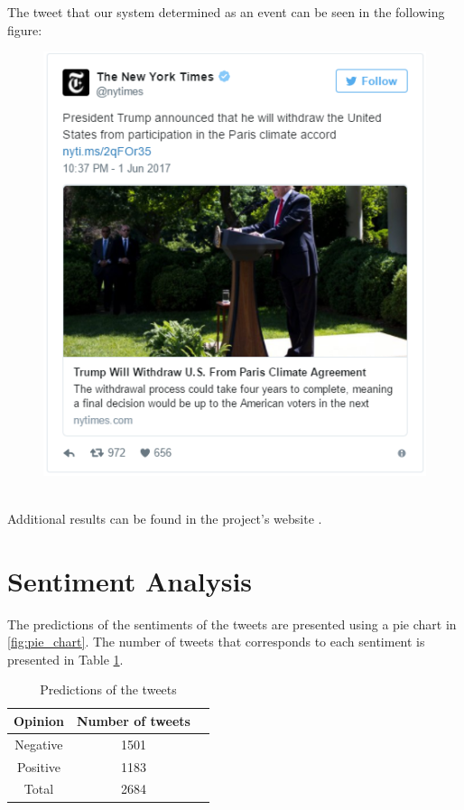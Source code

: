 \documentclass[12pt,svgnames]{report}
\begin{document}
\newpage
The tweet that our system determined as an event can be seen in the following figure:
\begin{figure}[h]
\centering
\includegraphics[scale=1]{hashparistweet.png}
\end{figure}
\\
Additional results can be found in the project's website \cite{projectwebsite}.

\section*{Sentiment Analysis}
The predictions of the sentiments of the tweets are presented using a pie chart in \ref{fig:pie_chart}. The number of tweets that corresponds to each sentiment is presented in Table \ref{tab:sentis}.

\begin{table}[H]
	\centering	
	\begin{tabular}{ccc}
		\toprule
		Opinion & Number of tweets\\
		\midrule
		Negative & 1501\\
		Positive & 1183\\		
		\bottomrule
		Total & 2684
	\end{tabular}
	\caption{Predictions of the tweets}
	\label{tab:sentis}
\end{table}
\end{document}
